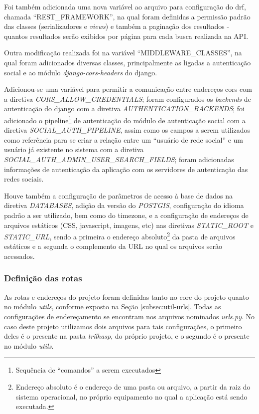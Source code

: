 Foi também adicionada uma nova variável ao arquivo para configuração do \gls{drf}, chamada ``REST\_FRAMEWORK'', na qual foram definidas a permissão padrão das classes (serializadores e \textit{views}) e também a paginação dos resultados - quantos resultados serão exibidos por página para cada busca realizada na API.

Outra modificação realizada foi na variável ``MIDDLEWARE\_CLASSES'', na qual foram adicionados diversas classes, principalmente as ligadas a autenticação social e ao módulo \textit{django-cors-headers} do \gls{django}.

Adicionou-se uma variável para permitir a comunicação entre endereços \gls{cors} com a diretiva \textit{CORS\_ALLOW\_CREDENTIALS}; foram configurados os \textit{backends} de autenticação do django com a diretiva \textit{AUTHENTICATION\_BACKENDS}; foi adicionado o pipeline\footnote{Sequência de ``comandos'' a serem executados} de autenticação do módulo de autenticação social com a diretiva \textit{SOCIAL\_AUTH\_PIPELINE}, assim como os campos a serem utilizados como referência para se criar a relação entre um ``usuário de rede social'' e um usuário já existente no sistema com a diretiva \textit{SOCIAL\_AUTH\_ADMIN\_USER\_SEARCH\_FIELDS}; foram adicionadas informações de autenticação da aplicação com os servidores de autenticação das redes sociais.

Houve também a configuração de parâmetros de acesso à base de dados na diretiva \textit{DATABASES}, adição da versão do \textit{POSTGIS}, configuração do idioma padrão a ser utilizado, bem como do timezone, e a configuração de endereços de arquivos estáticos (CSS, javascript, imagens, etc) nas diretivas \textit{STATIC\_ROOT} e \textit{STATIC\_URL}, sendo a primeira o endereço absoluto\footnote{Endereço absoluto é o endereço de uma pasta ou arquivo, a partir da raiz do sistema operacional, no próprio equipamento no qual a aplicação está sendo executada.} da pasta de arquivos estáticos e a segunda o complemento da URL no qual os arquivos serão acessados.

\subsubsection{Definição das rotas}
As rotas e endereços do projeto foram definidas tanto no core do projeto quanto no módulo \textit{utils}, conforme exposto na Seção \ref{subsec:util-urls}. Todas as configurações de endereçamento se encontram nos arquivos nominados \textit{urls.py}. No caso deste projeto utilizamos dois arquivos para tais configurações, o primeiro deles é o presente na pasta \textit{trilhasp}, do próprio projeto, e o segundo é o presente no módulo \textit{utils}.

